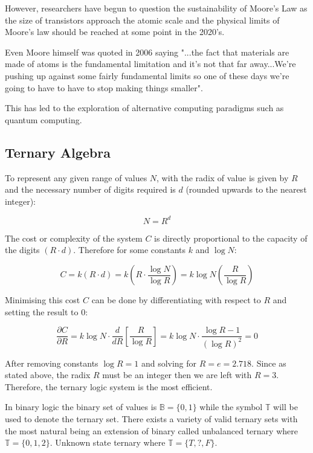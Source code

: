 \documentclass{article}
\begin{document}
However, researchers have begun to question the sustainability of Moore's Law as the size of transistors approach the
atomic scale and the physical limits of Moore's law should be reached at some point in the 2020's.
\citep{zhou2020quantum}

Even Moore himself was quoted in 2006 saying "...the fact that materials are made of atoms is the fundamental limitation
and it's not that far away...We're pushing up against some fairly fundamental limits so one of these days we're going to 
have to have to stop making things smaller".
\citep{moore2006interview}

This has led to the exploration of alternative computing paradigms such as quantum computing.

\subsection{Ternary Algebra}

To represent any given range of values $N$, with the radix of value is given by $R$ and the necessary number of digits 
required is $d$ (rounded upwards to the nearest integer):

\begin{equation}
  N = R^{d}
\end{equation}

The cost or complexity of the system $C$ is directly proportional to the capacity of the digits $(R \cdot d)$.
Therefore for some constants $k$ and $\log N$:
\citep{hurst1984mvl}

\begin{equation}
  C = k(R \cdot d) = k(R \cdot \frac{\log N}{\log R}) = k \log N (\frac{R}{\log R})
\end{equation}

Minimising this cost $C$ can be done by differentiating with respect to $R$ and setting the result to $0$:

\begin{equation}
  \frac{\partial C}{\partial R} = 
  k\log N\cdot\frac{d}{dR}\left[\frac{R}{\log R}\right] = 
  k\log N\cdot \frac{\log R -1}{(\log R)^2} = 0
\end{equation}

After removing constants $\log R = 1$ and solving for $R = e = 2.718$. Since as stated above, the radix $R$ must be an 
integer then we are left with $R = 3$. Therefore, the ternary logic system is the most efficient.
\citep{jaber2020mvl}

In binary logic the binary set of values is $\mathbb{B} = \{0, 1\}$ while the symbol $\mathbb{T}$ will be used to denote 
the ternary set. There exists a variety of valid ternary sets with the most natural being an extension of binary called
unbalanced ternary where $\mathbb{T} = \{0, 1, 2\}$. Unknown state ternary where $\mathbb{T} = \{T, ?, F\}$.
\end{document}
